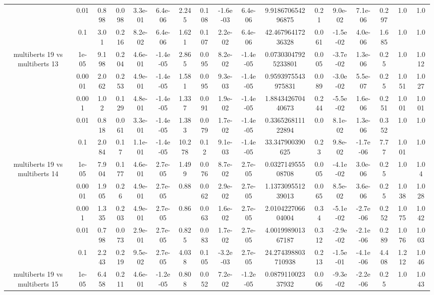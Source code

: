 \begin{tabular}{|c|c|c|c|c|c|c|c|c|c|c|c|c|c|c|c|c|}
 & 0.01 & 0.898 & 0.098 & 3.3e-01 & 6.4e-06 & 2.245 & 0.108 & -1.6e-03 & 6.4e-06 & 9.918670654296875 & 0.21 & 9.0e-02 & 7.1e-06 & 0.297 & 1.0 & 1.0 \\
 & 0.1 & 3.01 & 0.216 & 8.2e-02 & 6.4e-06 & 1.621 & 0.107 & 2.2e-02 & 6.4e-06 & 42.46796417236328 & 0.061 & -1.5e-02 & 4.0e-06 & 1.685 & 1.0 & 1.0 \\
\hline
\multirow{5}{*}{multiberts 19 vs multiberts 13} & 1e-05 & 9.198 & 0.204 & 4.6e-01 & -1.4e-05 & 2.865 & 0.095 & 8.2e-02 & -1.4e-05 & 0.07303047925233801 & 0.005 & -3.7e-02 & 1.3e-06 & 0.25 & 1.0 & 1.012 \\
 & 0.0001 & 2.062 & 0.253 & 4.9e-01 & -1.4e-05 & 1.581 & 0.095 & 9.3e-03 & -1.4e-05 & 0.9593975543975831 & 0.089 & -3.0e-02 & 5.5e-07 & 0.25 & 1.051 & 1.027 \\
 & 0.001 & 1.02 & 0.129 & 4.8e-01 & -1.4e-05 & 1.337 & 0.091 & 1.9e-02 & -1.4e-05 & 1.884342670440673 & 0.244 & -5.5e-02 & 1.6e-06 & 0.251 & 1.001 & 1.001 \\
 & 0.01 & 0.818 & 0.061 & 3.3e-01 & -1.4e-05 & 1.383 & 0.079 & 1.7e-02 & -1.4e-05 & 0.336526811122894 & 0.0 & 8.1e-02 & 1.3e-06 & 0.352 & 1.0 & 1.0 \\
 & 0.1 & 2.084 & 0.17 & 1.1e-01 & -1.4e-05 & 10.278 & 0.12 & 9.1e-03 & -1.4e-05 & 33.347900390625 & 0.23 & 9.8e-02 & -1.7e-06 & 7.77 & 1.001 & 1.0 \\
\hline
\multirow{5}{*}{multiberts 19 vs multiberts 14} & 1e-05 & 7.904 & 0.177 & 4.6e-01 & 2.7e-05 & 1.499 & 0.076 & 8.7e-02 & 2.7e-05 & 0.032714955508708 & 0.005 & -4.1e-02 & 3.0e-06 & 0.25 & 1.0 & 1.04 \\
 & 0.0001 & 1.905 & 0.26 & 4.9e-01 & 2.7e-05 & 0.88 & 0.062 & 2.9e-02 & 2.7e-05 & 1.137309551239013 & 0.065 & 8.5e-02 & 3.6e-06 & 0.25 & 1.038 & 1.028 \\
 & 0.001 & 1.335 & 0.203 & 4.9e-01 & 2.7e-05 & 0.86 & 0.063 & 1.6e-02 & 2.7e-05 & 2.010422706604004 & 0.34 & -5.1e-02 & -2.7e-06 & 0.252 & 1.075 & 1.042 \\
 & 0.01 & 0.798 & 0.073 & 2.9e-01 & 2.7e-05 & 0.825 & 0.083 & 1.7e-02 & 2.7e-05 & 4.001998901367187 & 0.312 & -2.9e-02 & -2.1e-06 & 0.289 & 1.076 & 1.003 \\
 & 0.1 & 2.243 & 0.219 & 9.5e-02 & 2.7e-05 & 4.038 & 0.105 & -3.2e-03 & 2.7e-05 & 24.274398803710938 & 0.213 & -1.5e-01 & -4.1e-06 & 4.408 & 1.212 & 1.046 \\
\hline
\multirow{5}{*}{multiberts 19 vs multiberts 15} & 1e-05 & 6.458 & 0.211 & 4.6e-01 & -1.2e-05 & 0.808 & 0.052 & 7.2e-02 & -1.2e-05 & 0.087911002337932 & 0.006 & -9.3e-02 & -2.2e-06 & 0.25 & 1.0 & 1.043 \\

\end{tabular}
